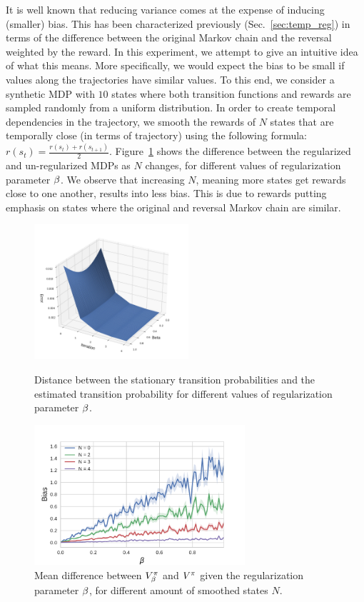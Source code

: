 It is well known that reducing variance comes at the expense of inducing (smaller) bias.
This has been characterized previously (Sec.~\ref{sec:temp_reg}) in terms of the difference between the original Markov chain and the reversal weighted by the reward. In this experiment, we attempt to give an intuitive idea of what this means. More specifically, we would expect the bias to be small if values along the trajectories have similar values.
To this end, we consider a synthetic MDP with $10$ states where both transition functions and rewards are sampled randomly from a uniform distribution. In order to create temporal dependencies in the trajectory, we smooth the rewards of $N$ states that are temporally close (in terms of trajectory) using the following formula: $ r(s_t) = \frac{r(s_t) + r(s_{t+1})}{2}$.
Figure~\ref{fig:mod} shows the difference between the regularized and un-regularized MDPs as $N$ changes, for different values of regularization parameter $\beta$.
We observe that increasing $N$, meaning more states get rewards close to one another, results into less bias. This is due to rewards putting emphasis on states where the original and reversal Markov chain are similar.

\begin{figure}
\begin{minipage}[c]{0.45\linewidth}
\includegraphics[height=5cm,width=\linewidth]{./fig/Markov_mixing.pdf}
\caption{Distance between the stationary transition probabilities and the estimated transition probability for different values of regularization parameter $\beta$.}
\label{fig:mixing}
\end{minipage}
\hfill
\begin{minipage}[c]{0.45\linewidth}
\includegraphics[height=5.2cm,width=\linewidth]{./fig/Bias_N.pdf}
\caption{Mean difference between $V_{\beta}^{\pi}$ and $V^{\pi}$ given the regularization parameter $\beta$, for different amount of smoothed states $N$.}
\label{fig:mod}
\end{minipage}
\end{figure}

